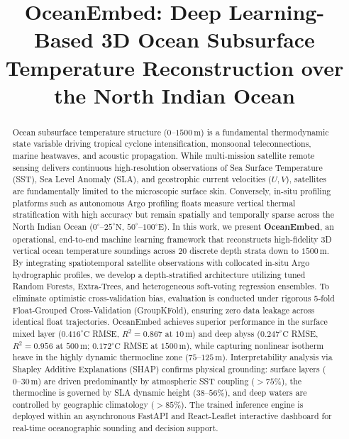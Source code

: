 \documentclass[conference]{IEEEtran}
\begin{document}
\title{OceanEmbed: Deep Learning-Based 3D Ocean Subsurface Temperature Reconstruction over the North Indian Ocean}

\author{
}

\maketitle

\begin{abstract}
Ocean subsurface temperature structure ($0\text{--}1500\,\text{m}$) is a fundamental thermodynamic state variable driving tropical cyclone intensification, monsoonal teleconnections, marine heatwaves, and acoustic propagation. While multi-mission satellite remote sensing delivers continuous high-resolution observations of Sea Surface Temperature (SST), Sea Level Anomaly (SLA), and geostrophic current velocities ($U, V$), satellites are fundamentally limited to the microscopic surface skin. Conversely, in-situ profiling platforms such as autonomous Argo profiling floats measure vertical thermal stratification with high accuracy but remain spatially and temporally sparse across the North Indian Ocean ($0^\circ\text{--}25^\circ\text{N}$, $50^\circ\text{--}100^\circ\text{E}$). In this work, we present \textbf{OceanEmbed}, an operational, end-to-end machine learning framework that reconstructs high-fidelity 3D vertical ocean temperature soundings across 20 discrete depth strata down to $1500\,\text{m}$. By integrating spatiotemporal satellite observations with collocated in-situ Argo hydrographic profiles, we develop a depth-stratified architecture utilizing tuned Random Forests, Extra-Trees, and heterogeneous soft-voting regression ensembles. To eliminate optimistic cross-validation bias, evaluation is conducted under rigorous 5-fold Float-Grouped Cross-Validation (GroupKFold), ensuring zero data leakage across identical float trajectories. OceanEmbed achieves superior performance in the surface mixed layer ($0.416^\circ\text{C}$ RMSE, $R^2 = 0.867$ at $10\,\text{m}$) and deep abyss ($0.247^\circ\text{C}$ RMSE, $R^2 = 0.956$ at $500\,\text{m}$; $0.172^\circ\text{C}$ RMSE at $1500\,\text{m}$), while capturing nonlinear isotherm heave in the highly dynamic thermocline zone ($75\text{--}125\,\text{m}$). Interpretability analysis via Shapley Additive Explanations (SHAP) confirms physical grounding: surface layers ($0\text{--}30\,\text{m}$) are driven predominantly by atmospheric SST coupling ($>75\%$), the thermocline is governed by SLA dynamic height ($38\text{--}56\%$), and deep waters are controlled by geographic climatology ($>85\%$). The trained inference engine is deployed within an asynchronous FastAPI and React-Leaflet interactive dashboard for real-time oceanographic sounding and decision support.
\end{abstract}
\end{document}
